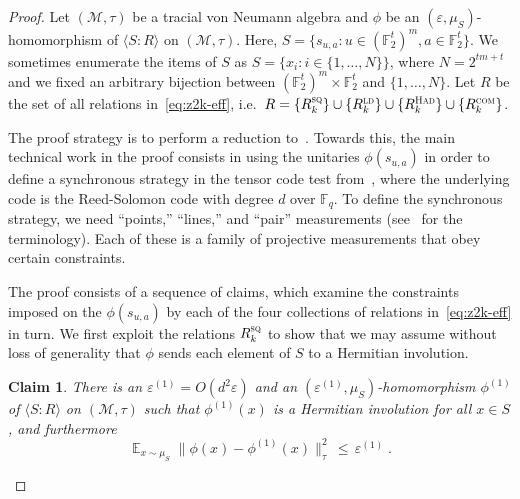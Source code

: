 \documentclass[11pt]{article}
\newtheorem{claim}[theorem]{Claim}
\theoremstyle{definition}
\DeclareMathOperator*{\Expectation}{\mathbb{E}}
\newcommand{\Es}[1]{\Expectation_{#1}}
\newcommand{\F}{\ensuremath{\mathbb{F}}}
\newcommand{\ld}{\textsc{ld}}
\newcommand{\com}{\textsc{com}}
\newcommand{\sq}{\textsc{sq}}
\newcommand{\mM}{\ensuremath{\mathcal{M}}}
\newcommand{\had}{\textsc{Had}}
\newcommand{\eps}{\varepsilon}
\begin{document}
\begin{proof}
Let $(\mM,\tau)$ be a tracial von Neumann algebra and $\phi$ be an $(\eps,\mu_S)$-homomorphism of $\langle S:R\rangle$ on $(\mM,\tau)$. 
 Here, $S = \{s_{u,a}: u\in (\F_2^t)^m, a\in \F_2^t\}$. We sometimes enumerate the items of $S$ as $S=\{x_i: i\in\{1,\ldots,N\}\}$, where $N=2^{tm+t}$ and we fixed an arbitrary bijection between $(\F_2^t)^m\times \F_2^t$ and $\{1,\ldots,N\}$. Let $R$ be the set of all relations in~\eqref{eq:z2k-eff}, i.e.\ $R= \{R_k^\sq\}\cup \{R^\ld_k\}\cup\{R^\had_k\}\cup\{R^\com_k\}$. 

The proof strategy is to perform a reduction to~\cite[Theorem 4.1]{ji2022quantum}. Towards this, the main technical work in the proof consists in using the unitaries $\phi(s_{u,a})$ in order to define a synchronous strategy in the tensor code test from~\cite{ji2022quantum}, where the underlying code is the Reed-Solomon code with degree $d$ over $\F_q$. To define the synchronous strategy, we need ``points,'' ``lines,'' and ``pair'' measurements (see~\cite{ji2022quantum} for the terminology). Each of these is a family of projective measurements that obey certain constraints. 

The proof consists of a sequence of claims, which examine the constraints imposed on the $\phi(s_{u,a})$ by each of the four collections of relations in~\eqref{eq:z2k-eff} in turn.%
We first exploit the relations $R_k^\sq$ to show that we may assume without loss of generality that $\phi$ sends each element of $S$ to a Hermitian involution. 

\begin{claim}\label{claim:z2-stab-1}
There is an $\eps^{(1)}=O(d^2\eps)$ and an $(\eps^{(1)},\mu_S)$-homomorphism $\phi^{(1)}$ of $\langle S:R\rangle$ on $(\mM,\tau)$ such that $\phi^{(1)}(x)$ is a Hermitian involution for all $x\in S$, and furthermore
\begin{equation}\label{eq:z2-stab-1a}
 \Es{x\sim\mu_S} \big\| \phi(x) - \phi^{(1)}(x) \big\|_\tau^2 \,\leq\, \eps^{(1)}\;.
\end{equation}
\end{claim}


\end{proof}
\end{document}
